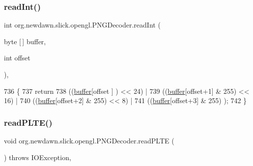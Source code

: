 \subsubsection{\texorpdfstring{read\+Int()}{readInt()}}
{\footnotesize\ttfamily int org.\+newdawn.\+slick.\+opengl.\+P\+N\+G\+Decoder.\+read\+Int (\begin{DoxyParamCaption}\item[{byte \mbox{[}$\,$\mbox{]}}]{buffer,  }\item[{int}]{offset }\end{DoxyParamCaption})\hspace{0.3cm}{\ttfamily [inline]}, {\ttfamily [private]}}


\begin{DoxyCode}
736                                                    \{
737         \textcolor{keywordflow}{return}
738                 ((\mbox{\hyperlink{classorg_1_1newdawn_1_1slick_1_1opengl_1_1_p_n_g_decoder_ae205f9222586a2bc01a8a240c5c210ad}{buffer}}[offset  ]      ) << 24) |
739                 ((\mbox{\hyperlink{classorg_1_1newdawn_1_1slick_1_1opengl_1_1_p_n_g_decoder_ae205f9222586a2bc01a8a240c5c210ad}{buffer}}[offset+1] & 255) << 16) |
740                 ((\mbox{\hyperlink{classorg_1_1newdawn_1_1slick_1_1opengl_1_1_p_n_g_decoder_ae205f9222586a2bc01a8a240c5c210ad}{buffer}}[offset+2] & 255) <<  8) |
741                 ((\mbox{\hyperlink{classorg_1_1newdawn_1_1slick_1_1opengl_1_1_p_n_g_decoder_ae205f9222586a2bc01a8a240c5c210ad}{buffer}}[offset+3] & 255)      );
742     \}
\end{DoxyCode}
\mbox{\label{classorg_1_1newdawn_1_1slick_1_1opengl_1_1_p_n_g_decoder_ab43622729c487fd442e6cbd9fcd7e1ed}} 
\subsubsection{\texorpdfstring{read\+P\+L\+T\+E()}{readPLTE()}}
{\footnotesize\ttfamily void org.\+newdawn.\+slick.\+opengl.\+P\+N\+G\+Decoder.\+read\+P\+L\+TE (\begin{DoxyParamCaption}{ }\end{DoxyParamCaption}) throws I\+O\+Exception\hspace{0.3cm}{\ttfamily [inline]}, {\ttfamily [private]}}


